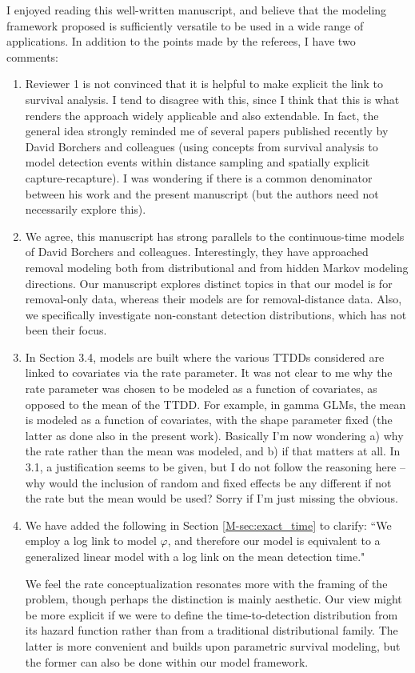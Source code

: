 \documentclass[12pt]{article}
\renewenvironment{quote}  %
              {\list{}{\rightmargin\leftmargin}\normalfont%
               \item\relax}
              {\endlist}
\begin{document}
I enjoyed reading this well-written manuscript, and believe that the modeling framework proposed is sufficiently versatile to be used in a wide range of applications. In addition to the points made by the referees, I have two comments:
\begin{enumerate}
\item Reviewer 1 is not convinced that it is helpful to make explicit the link to survival analysis. I tend to disagree with this, since I think that this is what renders the approach widely applicable and also extendable. In fact, the general idea strongly reminded me of several papers published recently by David Borchers and colleagues (using concepts from survival analysis to model detection events within distance sampling and spatially explicit capture-recapture). I was wondering if there is a common denominator between his work and the present manuscript (but the authors need not necessarily explore this).
\begin{quote}
We agree, this manuscript has strong parallels to the continuous-time models of David Borchers and colleagues.  
Interestingly, they have approached removal modeling both from distributional and from hidden Markov modeling directions.
Our manuscript explores distinct topics in that our model is for removal-only data, whereas their models are for removal-distance data.
Also, we specifically investigate non-constant detection distributions, which has not been their focus.
\end{quote}


\item In Section 3.4, models are built where the various TTDDs considered are linked to covariates via the rate parameter. It was not clear to me why the rate parameter was chosen to be modeled as a function of covariates, as opposed to the mean of the TTDD. For example, in gamma GLMs, the mean is modeled as a function of covariates, with the shape parameter fixed (the latter as done also in the present work). Basically I'm now wondering a) why the rate rather than the mean was modeled, and b) if that matters at all. In 3.1, a justification seems to be given, but I do not follow the reasoning here – why would the inclusion of random and fixed effects be any different if not the rate but the mean would be used? Sorry if I'm just missing the obvious.
\begin{quote}
We have added the following in Section \ref{M-sec:exact_time} to clarify: ``We employ a log link to model $\varphi$, and therefore our model is equivalent to a generalized linear model with a log link on the mean detection time."

We feel the rate conceptualization resonates more with the framing of the problem, though perhaps the distinction is mainly aesthetic.
Our view might be more explicit if we were to define the time-to-detection distribution from its hazard function rather than from a traditional distributional family. 
The latter is more convenient and builds upon parametric survival modeling, but the former can also be done within our model framework.
\end{quote}
\end{enumerate}
\end{document}
